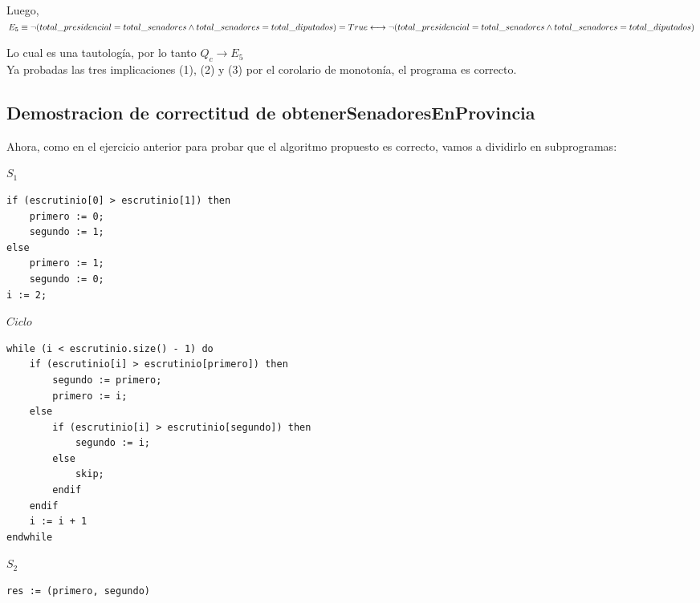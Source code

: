 \documentclass[10pt,a4paper]{article}
\begin{document}
\noindent  Luego, \\

\noindent $E_5 \equiv \neg (total\_presidencial = total\_senadores \land total\_senadores = total\_diputados) = True \longleftrightarrow \\
\neg (total\_presidencial = total\_senadores \land total\_senadores = total\_diputados)\vspace{0.3cm}$

\noindent Lo cual es una tautología, por lo tanto $Q_c \rightarrow E_5$ \\

\noindent Ya probadas las tres implicaciones (1), (2) y (3) por el corolario de monotonía, el programa es correcto.

\newpage

\subsection{Demostracion de correctitud de obtenerSenadoresEnProvincia}

Ahora, como en el ejercicio anterior para probar que el algoritmo propuesto es correcto, vamos a dividirlo en subprogramas:

\vspace{0.3cm}

$S_1$
	\begin{lstlisting}[caption={},label=code:for]
if (escrutinio[0] > escrutinio[1]) then
	primero := 0;
	segundo := 1;
else
	primero := 1;
	segundo := 0;
i := 2;
	\end{lstlisting}

\vspace{0.3cm}

$Ciclo$
	\begin{lstlisting}[caption={},label=code:for]
while (i < escrutinio.size() - 1) do
	if (escrutinio[i] > escrutinio[primero]) then
		segundo := primero;
		primero := i;
	else
		if (escrutinio[i] > escrutinio[segundo]) then
			segundo := i;
		else
			skip;
		endif
	endif
	i := i + 1
endwhile
	\end{lstlisting}

\vspace{0.3cm}

$S_2$

	\begin{lstlisting}[caption={},label=code:for]
res := (primero, segundo)
	\end{lstlisting}

\vspace{0.3cm}
\end{document}
